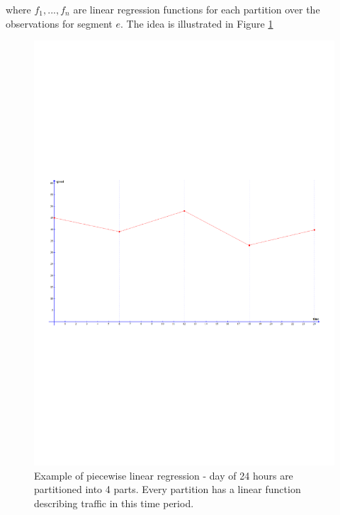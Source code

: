 where $f_1,...,f_n$ are linear regression functions for each partition over the observations for segment $e$. The idea is illustrated in Figure \ref{fig:segmented-regression}
\begin{figure}
\centering
\includegraphics[trim={0 9cm 0 9cm},clip, width=\textwidth]{figures/piecewise.pdf}
\caption{Example of piecewise linear regression - day of 24 hours are partitioned into 4 parts. Every partition has a linear function describing traffic in this time period.}
\label{fig:segmented-regression}
\end{figure}
